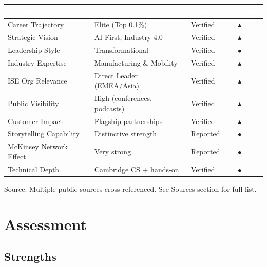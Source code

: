 \documentclass[11pt,a4paper]{article}
\newcommand{\kpiup}{\textcolor{msgreen}{$\blacktriangle$}}
\newcommand{\kpiflat}{\textcolor{msgray}{$\bullet$}}
\begin{document}
\begin{center}
\begin{longtable}{L{4.5cm}R{3cm}C{2.5cm}C{1.5cm}}
\toprule
{}
\textcolor{white}{\textbf{Dimension}} &
\textcolor{white}{\textbf{Assessment}} &
\textcolor{white}{\textbf{Confidence}} &
\textcolor{white}{\textbf{Trend}} \\
\midrule
Career Trajectory & Elite (Top 0.1\%) & Verified & \kpiup \\
Strategic Vision & AI-First, Industry 4.0 & Verified & \kpiup \\
Leadership Style & Transformational & Verified & \kpiflat \\
Industry Expertise & Manufacturing \& Mobility & Verified & \kpiup \\
ISE Org Relevance & Direct Leader (EMEA/Asia) & Verified & \kpiup \\
Public Visibility & High (conferences, podcasts) & Verified & \kpiup \\
Customer Impact & Flagship partnerships & Verified & \kpiup \\
Storytelling Capability & Distinctive strength & Reported & \kpiflat \\
McKinsey Network Effect & Very strong & Reported & \kpiflat \\
Technical Depth & Cambridge CS + hands-on & Verified & \kpiflat \\
\bottomrule
\end{longtable}
\end{center}

\textcolor{msgray}{\scriptsize Source: Multiple public sources cross-referenced. See Sources section for full list.}

\newpage

\section{Assessment}

\subsection{Strengths}
\end{document}
